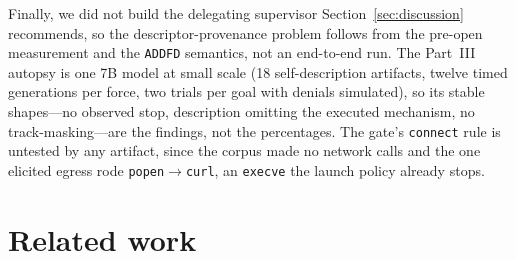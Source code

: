 \documentclass[11pt]{article}
\begin{document}
Finally, we did not build the delegating supervisor Section~\ref{sec:discussion} recommends, so the
descriptor-provenance problem follows from the pre-open measurement and the \texttt{ADDFD} semantics, not
an end-to-end run. The Part~III autopsy is one 7B model at small scale (18 self-description artifacts,
twelve timed generations per force, two trials per goal with denials simulated), so its stable
shapes---no observed stop, description omitting the executed mechanism, no track-masking---are the
findings, not the percentages. The gate's \texttt{connect} rule is untested by any artifact, since the
corpus made no network calls and the one elicited egress rode \texttt{popen}$\rightarrow$\texttt{curl}, an
\texttt{execve} the launch policy already stops.

\section{Related work}\label{sec:related}
\end{document}
